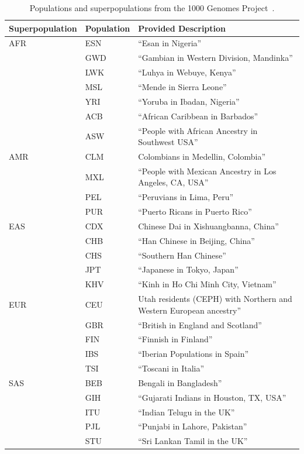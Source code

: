 \begin{table}
\centering
\begin{tabular}{llp{6cm}}
\textbf{Superpopulation} & \textbf{Population} & \textbf{Provided Description} \\
\hline
AFR & ESN & ``Esan in Nigeria'' \\
& GWD & ``Gambian in Western Division, Mandinka'' \\
& LWK & ``Luhya in Webuye, Kenya'' \\
& MSL & ``Mende in Sierra Leone'' \\
& YRI & ``Yoruba in Ibadan, Nigeria'' \\
& ACB & ``African Caribbean in Barbados'' \\
& ASW & ``People with African Ancestry in Southwest USA'' \\
\hline
AMR & CLM & Colombians in Medellin, Colombia'' \\
& MXL & ``People with Mexican Ancestry in Los Angeles, CA, USA'' \\
& PEL & ``Peruvians in Lima, Peru'' \\
& PUR & ``Puerto Ricans in Puerto Rico'' \\
\hline
EAS & CDX & Chinese Dai in Xishuangbanna, China'' \\
& CHB & ``Han Chinese in Beijing, China'' \\
& CHS & ``Southern Han Chinese'' \\
& JPT & ``Japanese in Tokyo, Japan'' \\
& KHV & ``Kinh in Ho Chi Minh City, Vietnam'' \\
\hline
EUR & CEU & Utah residents (CEPH) with Northern and Western European ancestry'' \\
& GBR & ``British in England and Scotland'' \\
& FIN & ``Finnish in Finland'' \\
& IBS & ``Iberian Populations in Spain'' \\
& TSI & ``Toscani in Italia'' \\
\hline
SAS & BEB & Bengali in Bangladesh'' \\
& GIH & ``Gujarati Indians in Houston, TX, USA'' \\
& ITU & ``Indian Telugu in the UK'' \\
& PJL & ``Punjabi in Lahore, Pakistan'' \\
& STU & ``Sri Lankan Tamil in the UK'' \\
\hline
\end{tabular}
\caption[Populations and superpopulations from the 1000 Genomes Project]{Populations and superpopulations from the 1000 Genomes Project~\cite{10002015global}.}
\label{tbl:populations}
\end{table}

